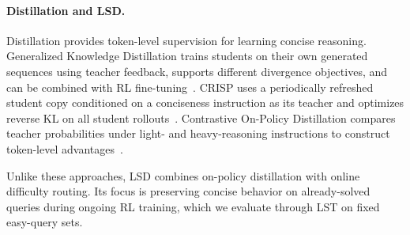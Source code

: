 \paragraph{Distillation and LSD.}
Distillation provides token-level supervision for learning concise reasoning. Generalized Knowledge Distillation trains students on their own generated sequences using teacher feedback, supports different divergence objectives, and can be combined with RL fine-tuning~\citep{agarwal2024onpolicy}. CRISP uses a periodically refreshed student copy conditioned on a conciseness instruction as its teacher and optimizes reverse KL on all student rollouts~\citep{sang2026opsdc}. Contrastive On-Policy Distillation compares teacher probabilities under light- and heavy-reasoning instructions to construct token-level advantages~\citep{ruan2026contrastive}.

Unlike these approaches, LSD combines on-policy distillation with online difficulty routing. Its focus is preserving concise behavior on already-solved queries during ongoing RL training, which we evaluate through LST on fixed easy-query sets.
